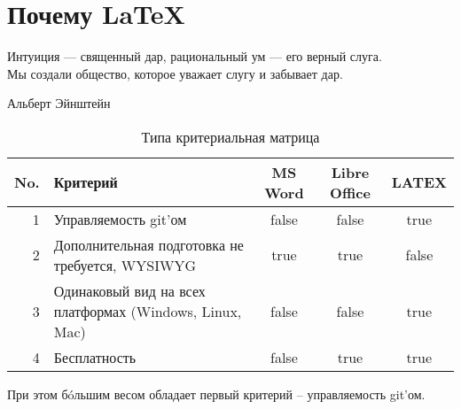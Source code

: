 \section{Почему \LaTeX}

\epigraph{
    Интуиция --- священный дар, рациональный ум --- его верный слуга.\\
    Мы создали общество, которое уважает слугу и забывает дар.}{Альберт Эйнштейн}

\begin{table}[h]
    \caption{Типа критериальная матрица}
    \label{criterion_table}
    \begin{tabular}{|r|p{}|c|c|c|}
        \hline
        \textbf{No.}          &
        \textbf{Критерий}     &
        \textbf{MS Word}      &
        \textbf{Libre Office} &
        \textbf{LATEX}        \\ \hline
        1 & Управляемость git'ом & false & false & true \\ \hline
        2 & \raggedright Дополнительная подготовка не требуется, WYSIWYG
          & true & true & false \\ \hline
        3 & Одинаковый вид на всех платформах (Windows, Linux, Mac) & false & false & true \\ \hline
        4 & Бесплатность & false & true & true \\ \hline
    \end{tabular}
\end{table}

При этом б\'oльшим весом обладает первый критерий -- управляемость git'ом.

\clearpage